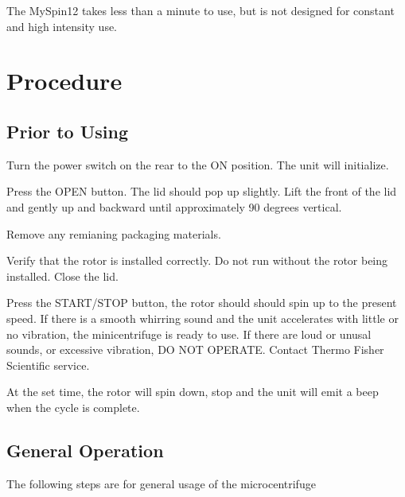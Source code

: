 \documentclass[12pt]{../SOP3_beta}
\begin{document}
\NP The MySpin12 takes less than a minute to use, but is not designed for constant and high intensity use. 

\section{Procedure}

\subsection*{Prior to Using} 

\NP Turn the power switch on the rear to the ON position. The unit will initialize.

\NP Press the OPEN button. The lid should pop up slightly. Lift the front of the lid and gently up and backward until approximately 90 degrees vertical. 

\NP Remove any remianing packaging materials. 

\NP Verify that the rotor is installed correctly. Do not run without the rotor being installed. Close the lid.

\NP Press the START/STOP button, the rotor should should spin up to the present speed. If there is a smooth whirring sound and the unit accelerates with little or no vibration, the minicentrifuge is ready to use. If there are loud or unusal sounds, or excessive vibration, DO NOT OPERATE. Contact Thermo Fisher Scientific service.

\NP At the set time, the rotor will spin down, stop and the unit will emit a beep when the cycle is complete. 

\subsection*{General Operation}

\NP The following steps are for general usage of the microcentrifuge
\end{document}
